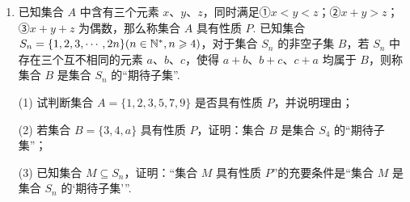 \documentclass[a4paper,11pt]{article}
\begin{document}
\begin{enumerate}
\ifanswer
\solbegin
{}
\solend
\fi

\item 已知集合 $A$ 中含有三个元素 $x$、$y$、$z$，同时满足①$x<y<z$；②$x+y>z$；③$x+y+z$ 为偶数，那么称集合 $A$ 具有性质 $P$. 已知集合 $S_n=\{1,2,3,\cdots,2n\}(n\in\mathbb{N}^*,n\geqslant4)$，对于集合 $S_n$ 的非空子集 $B$，若 $S_n$ 中存在三个互不相同的元素 $a$、$b$、$c$，使得 $a+b$、$b+c$、$c+a$ 均属于 $B$，则称集合 $B$ 是集合 $S_n$ 的“期待子集”.

(1) 试判断集合 $A=\{1,2,3,5,7,9\}$ 是否具有性质 $P$，并说明理由；

(2) 若集合 $B=\{3,4,a\}$ 具有性质 $P$，证明：集合 $B$ 是集合 $S_4$ 的“期待子集”；

(3) 已知集合 $M\subseteq S_n$，证明：“集合 $M$ 具有性质 $P$”的充要条件是“集合 $M$ 是集合 $S_n$ 的‘期待子集’”.


\end{enumerate}
\end{document}
